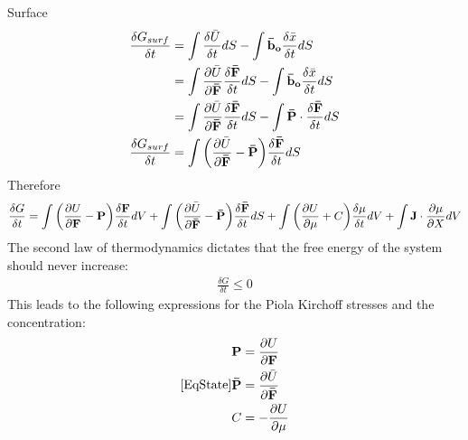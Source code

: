 \documentclass[12pt,3p]{article}
\numberwithin{equation}{section}
\begin{document}
Surface
\begin{align*}
\frac{\delta G_{surf}}{\delta t} &= \int \frac{\delta \bar{U}}{\delta t} dS - \int \mathbf{\bar{b}_o} \frac{\delta \bar{x}}{\delta t} dS \\
	&= \int \pdv{\bar{U}}{\mathbf{\bar{F}}} \frac{\delta \mathbf{\bar{F}}}{\delta t} dS - \int \mathbf{\bar{b}_o} \frac{\delta \bar{x}}{\delta t} dS \\
	&= \int \pdv{\bar{U}}{\mathbf{\bar{F}}} \frac{\delta \mathbf{\bar{F}}}{\delta t} dS - \int \mathbf{\bar{P}} \cdot \frac{\delta \mathbf{\bar{F}}}{\delta t} dS \\
\frac{\delta G_{surf}}{\delta t} &= \int \bigg( \pdv{\bar{U}}{\mathbf{\bar{F}}} - \mathbf{\bar{P}} \bigg)  \frac{\delta \mathbf{\bar{F}}}{\delta t} dS 
\end{align*}
Therefore 
\begin{align}\label{EqFreeEnergyRate}
\frac{\delta G}{\delta t} = \int \bigg( \pdv{U}{\mathbf{F}} - \mathbf{P} \bigg) \frac{\delta \mathbf{F}}{\delta t} dV + \int \bigg( \pdv{\bar{U}}{\mathbf{\bar{F}}} - \mathbf{\bar{P}} \bigg)  \frac{\delta \mathbf{\bar{F}}}{\delta t} dS + \int \bigg( \pdv{U}{\mu} + C \bigg) \frac{\delta \mu}{\delta t} dV + \int \mathbf{J} \cdot \pdv{\mu}{X} dV
\end{align}
The second law of thermodynamics dictates that the free energy of the system should never increase: 
\begin{align}\label{EqSecondLawTherm}
\frac{\delta G}{\delta t} \leq 0 
\end{align}
This leads to the following expressions for the Piola Kirchoff stresses and the concentration: 
\begin{subequations}\ref{EqState}
\begin{align}
\mathbf{P} &= \pdv{U}{\mathbf{F}} \\
\mathbf{\bar{P}} &= \pdv{\bar{U}}{\mathbf{\bar{F}}} \\
C &= -\pdv{U}{\mu}
\end{align}
\end{subequations}

\end{document}
